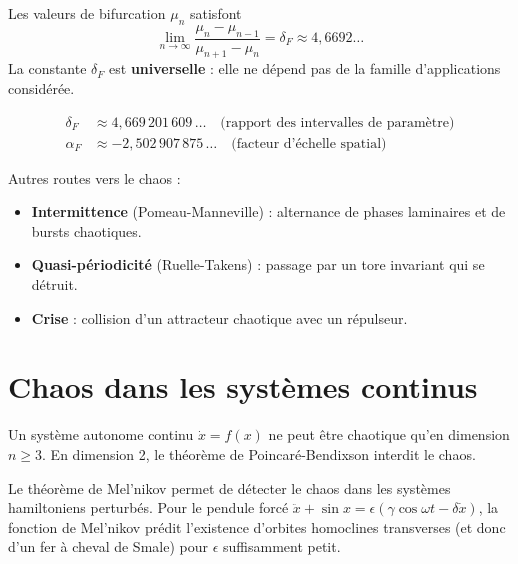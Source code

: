 \begin{theoreme}
Les valeurs de bifurcation $\mu_n$ satisfont
\[
    \lim_{n \to \infty} \frac{\mu_n - \mu_{n-1}}{\mu_{n+1} - \mu_n} = \delta_F \approx 4{,}6692\ldots
\]
La constante $\delta_F$ est \textbf{universelle} : elle ne d\'epend pas de
la famille d'applications consid\'er\'ee.
\end{theoreme}

\begin{formules}[title=\textbf{Constantes de Feigenbaum}]
\begin{align*}
    \delta_F &\approx 4{,}669\,201\,609\,\ldots \quad \text{(rapport des intervalles de param\`etre)} \\
    \alpha_F &\approx -2{,}502\,907\,875\,\ldots \quad \text{(facteur d'\'echelle spatial)}
\end{align*}
\end{formules}

Autres routes vers le chaos :
\begin{itemize}
    \item \textbf{Intermittence} (Pomeau-Manneville) : alternance de phases
    laminaires et de bursts chaotiques.
    \item \textbf{Quasi-p\'eriodicit\'e} (Ruelle-Takens) : passage par un
    tore invariant qui se d\'etruit.
    \item \textbf{Crise} : collision d'un attracteur chaotique avec un
    r\'epulseur.
\end{itemize}

\section{Chaos dans les syst\`emes continus}

\begin{attention}[title=\textbf{Dimension minimale pour le chaos continu}]
Un syst\`eme autonome continu $\dot{x} = f(x)$ ne peut \^etre chaotique
qu'en dimension $n \geq 3$. En dimension 2, le th\'eor\`eme de
Poincar\'e-Bendixson interdit le chaos.
\end{attention}

\begin{exemple}
Le th\'eor\`eme de Mel'nikov permet de d\'etecter le chaos dans les syst\`emes
hamiltoniens perturb\'es. Pour le pendule forc\'e
$\ddot{x} + \sin x = \epsilon(\gamma\cos\omega t - \delta\dot{x})$,
la fonction de Mel'nikov pr\'edit l'existence d'orbites homoclines
transverses (et donc d'un fer \`a cheval de Smale) pour $\epsilon$
suffisamment petit.
\end{exemple}

